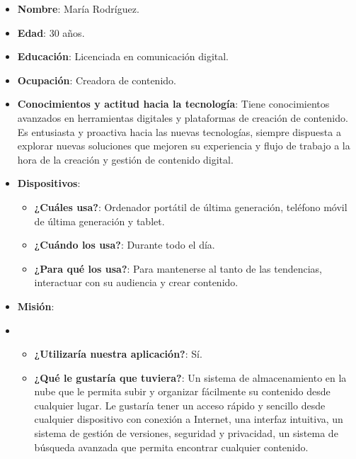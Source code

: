     \begin{itemize}
        \item \textbf{Nombre}: María Rodríguez.
        \item \textbf{Edad}: 30 años.
        \item \textbf{Educación}: Licenciada en comunicación digital.
        \item \textbf{Ocupación}: Creadora de contenido.
        \item \textbf{Conocimientos y actitud hacia la tecnología}: Tiene conocimientos avanzados en herramientas digitales y plataformas de creación de contenido. Es entusiasta y proactiva hacia las nuevas tecnologías, siempre dispuesta a explorar nuevas soluciones que mejoren su experiencia y flujo de trabajo a la hora de la creación y gestión de contenido digital.
        \item \textbf{Dispositivos}:
            \begin{itemize}

            \item \textbf{¿Cuáles usa?}: Ordenador portátil de última generación, teléfono móvil de última generación y tablet.
            \item \textbf{¿Cuándo los usa?}: Durante todo el día.
            \item \textbf{¿Para qué los usa?}: Para mantenerse al tanto de las tendencias, interactuar con su audiencia y crear contenido.

            \end{itemize}
        \item \textbf{Misión}:
        \item 
            \begin{itemize}

                \item \textbf{¿Utilizaría nuestra aplicación?}: Sí.

                \item \textbf{¿Qué le gustaría que tuviera?}: Un sistema de almacenamiento en la nube que le permita subir y organizar fácilmente su contenido desde cualquier lugar. Le gustaría tener un acceso rápido y sencillo desde cualquier dispositivo con conexión a Internet, una interfaz intuitiva, un sistema de gestión de versiones, seguridad y privacidad, un sistema de búsqueda avanzada que permita encontrar cualquier contenido.

            \end{itemize}
        
    \end{itemize}

